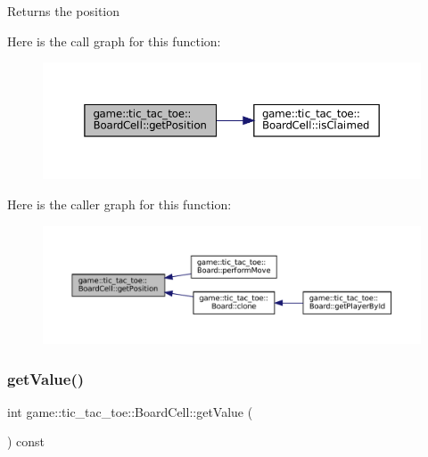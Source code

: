 \begin{DoxyReturn}{Returns}
the position 
\end{DoxyReturn}
Here is the call graph for this function\+:
\nopagebreak
\begin{figure}[H]
\begin{center}
\leavevmode
\includegraphics[width=350pt]{classgame_1_1tic__tac__toe_1_1_board_cell_aa418994b5cdf5c74b105701193d72a1b_cgraph}
\end{center}
\end{figure}
Here is the caller graph for this function\+:
\nopagebreak
\begin{figure}[H]
\begin{center}
\leavevmode
\includegraphics[width=350pt]{classgame_1_1tic__tac__toe_1_1_board_cell_aa418994b5cdf5c74b105701193d72a1b_icgraph}
\end{center}
\end{figure}
\mbox{\label{classgame_1_1tic__tac__toe_1_1_board_cell_a14b1c802c346bbeec7263b77ea6266c8}} 
\subsubsection{\texorpdfstring{get\+Value()}{getValue()}}
{\footnotesize\ttfamily int game\+::tic\+\_\+tac\+\_\+toe\+::\+Board\+Cell\+::get\+Value (\begin{DoxyParamCaption}{ }\end{DoxyParamCaption}) const}



